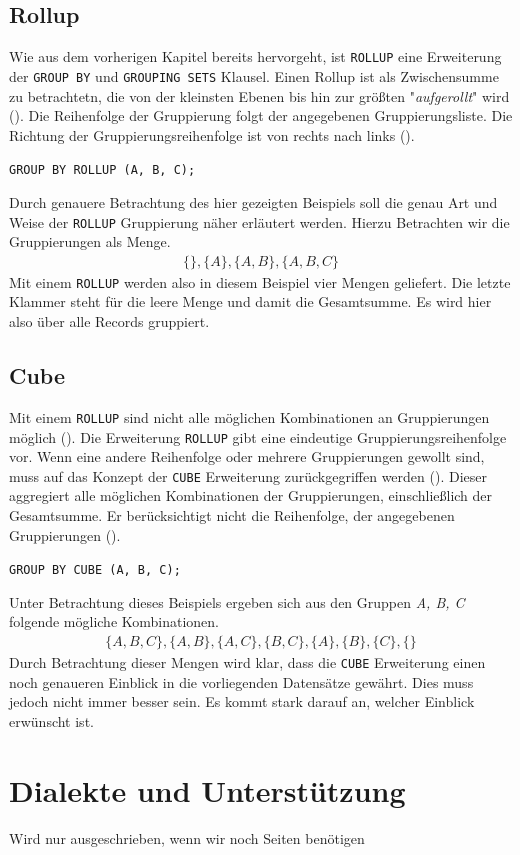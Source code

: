 \subsection{Rollup}
Wie aus dem vorherigen Kapitel bereits hervorgeht, ist \texttt{ROLLUP} eine
Erweiterung der \texttt{GROUP BY} und \texttt{GROUPING SETS} Klausel. Einen Rollup
ist als Zwischensumme zu betrachtetn, die von der kleinsten Ebenen bis hin zur
größten "\textit{aufgerollt}" wird (\cite{oracle16}). Die Reihenfolge der
Gruppierung folgt der angegebenen Gruppierungsliste. Die Richtung der Gruppierungsreihenfolge
ist von rechts nach links (\cite{oracle16}).

\texttt{GROUP BY ROLLUP (A, B, C);}

Durch genauere Betrachtung des hier gezeigten Beispiels soll die genau Art und Weise
der \texttt{ROLLUP} Gruppierung näher erläutert werden. Hierzu Betrachten wir die
Gruppierungen als Menge.
\begin{align*}
	\{ \}, \{A\}, \{A, B\}, \{A, B, C\}
\end{align*}
Mit einem \texttt{ROLLUP} werden also in diesem Beispiel vier Mengen geliefert.
Die letzte Klammer steht für die leere Menge und damit die Gesamtsumme. Es wird hier
also über alle Records gruppiert.

\subsection{Cube}
Mit einem \texttt{ROLLUP} sind nicht alle möglichen Kombinationen an
Gruppierungen möglich (\cite{oracle16}). Die Erweiterung \texttt{ROLLUP} gibt
eine eindeutige Gruppierungsreihenfolge vor. Wenn eine andere Reihenfolge oder mehrere
Gruppierungen gewollt sind, muss auf das Konzept der \texttt{CUBE} Erweiterung zurückgegriffen
werden (\cite{oracle16}). Dieser aggregiert alle möglichen Kombinationen der
Gruppierungen, einschließlich der Gesamtsumme. Er berücksichtigt nicht die
Reihenfolge, der angegebenen Gruppierungen (\cite{oracle16}).

\texttt{GROUP BY CUBE (A, B, C);}

Unter Betrachtung dieses Beispiels ergeben sich aus den Gruppen \textit{A, B, C}
folgende mögliche Kombinationen.
\begin{align*}
	\{ A, B, C\}, \{A, B\}, \{A, C\}, \{B, C\}, \{A\}, \{B\}, \{C\}, \{ \}
\end{align*}
Durch Betrachtung dieser Mengen wird klar, dass die \texttt{CUBE} Erweiterung einen
noch genaueren Einblick in die vorliegenden Datensätze gewährt. Dies muss jedoch
nicht immer besser sein. Es kommt stark darauf an, welcher Einblick erwünscht
ist.


\section{Dialekte und Unterstützung}
Wird nur ausgeschrieben, wenn wir noch Seiten benötigen
